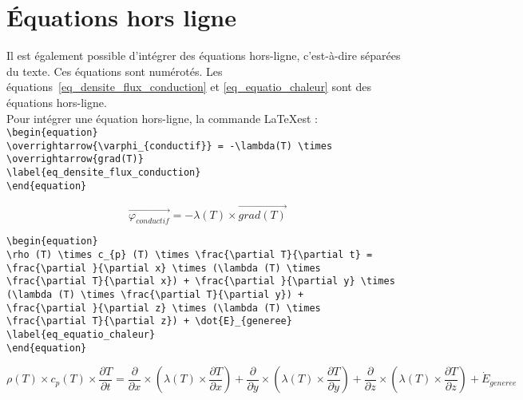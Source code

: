 \documentclass[a4paper,12pt]{report}
\begin{document}
\section{Équations hors ligne}
Il est également possible d'intégrer des équations hors-ligne, c'est-à-dire séparées du texte. Ces équations sont numérotés. Les équations~\ref{eq_densite_flux_conduction} et \ref{eq_equatio_chaleur} sont des équations hors-ligne. \\

Pour intégrer une équation hors-ligne, la commande \LaTeX est : \\
\verb|\begin{equation}| \\
\verb|\overrightarrow{\varphi_{conductif}} = -\lambda(T) \times \overrightarrow{grad(T)}| \\
\verb|\label{eq_densite_flux_conduction}| \\
\verb|\end{equation}|

\begin{equation}
\overrightarrow{\varphi_{conductif}} = -\lambda(T) \times \overrightarrow{grad(T)}
\label{eq_densite_flux_conduction}
\end{equation}

\verb|\begin{equation}| \\
\verb|\rho (T) \times c_{p} (T) \times \frac{\partial T}{\partial t} = | \\
\verb|\frac{\partial }{\partial x} \times (\lambda (T) \times | \\
\verb|\frac{\partial T}{\partial x}) + \frac{\partial }{\partial y} \times | \\
\verb|(\lambda (T) \times \frac{\partial T}{\partial y}) + | \\
\verb|\frac{\partial }{\partial z} \times (\lambda (T) \times | \\
\verb|\frac{\partial T}{\partial z}) + \dot{E}_{generee}| \\
\verb|\label{eq_equatio_chaleur}| \\
\verb|\end{equation}|

\begin{equation}
\rho (T) \times c_{p} (T) \times \frac{\partial T}{\partial t} = \frac{\partial }{\partial x} \times (\lambda (T) \times \frac{\partial T}{\partial x}) + \frac{\partial }{\partial y} \times (\lambda (T) \times \frac{\partial T}{\partial y}) + \frac{\partial }{\partial z} \times (\lambda (T) \times \frac{\partial T}{\partial z}) + \dot{E}_{generee}
\label{eq_equatio_chaleur}
\end{equation}
\end{document}
